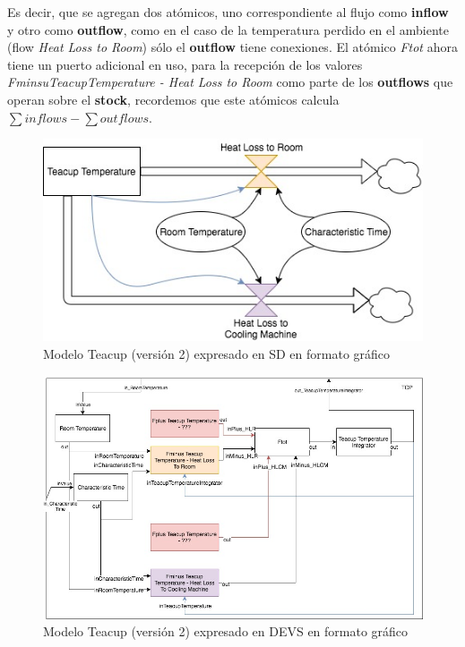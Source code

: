 Es decir, que se agregan dos atómicos, uno correspondiente al flujo como \textbf{inflow} y otro como \textbf{outflow}, como en el caso de la temperatura perdido en el ambiente (flow \textit{Heat Loss to Room}) sólo el \textbf{outflow} tiene conexiones. El atómico \textit{Ftot} ahora tiene un puerto adicional en uso, para la recepción de los valores \textit{FminsuTeacupTemperature - Heat Loss to Room} como parte de los \textbf{outflows} que operan sobre el \textbf{stock}, recordemos que este atómicos calcula $\sum inflows - \sum outflows $.


\begin{figure}[!h]
\centering
\includegraphics[scale=0.4]{imagenes/Teacup_sd_2}
\caption{Modelo Teacup (versión 2) expresado en SD en formato gráfico}
\label{fig:Teacup_sd_2}
\end{figure}

\begin{figure}[!h]
\centering
\includegraphics[scale=0.4]{imagenes/Teacup_devs_flattened_2}
\caption{Modelo Teacup (versión 2) expresado en DEVS en formato gráfico}
\label{fig:Teacup_devs_flattened_2}
\end{figure}

